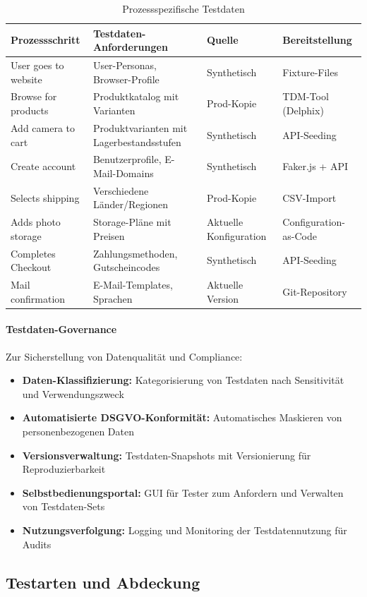 \begin{longtable}{|p{3cm}|p{5cm}|p{3cm}|p{3cm}|}
\caption{Prozessspezifische Testdaten} \\
\hline
\textbf{Prozessschritt} & \textbf{Testdaten-Anforderungen} & \textbf{Quelle} & \textbf{Bereitstellung}\\
\hline
User goes to website & User-Personas, Browser-Profile & Synthetisch & Fixture-Files\\
\hline
Browse for products & Produktkatalog mit Varianten & Prod-Kopie & TDM-Tool (Delphix)\\
\hline
Add camera to cart & Produktvarianten mit Lagerbestandsstufen & Synthetisch & API-Seeding\\
\hline
Create account & Benutzerprofile, E-Mail-Domains & Synthetisch & Faker.js + API\\
\hline
Selects shipping & Verschiedene Länder/Regionen & Prod-Kopie & CSV-Import\\
\hline
Adds photo storage & Storage-Pläne mit Preisen & Aktuelle Konfiguration & Configuration-as-Code\\
\hline
Completes Checkout & Zahlungsmethoden, Gutscheincodes & Synthetisch & API-Seeding\\
\hline
Mail confirmation & E-Mail-Templates, Sprachen & Aktuelle Version & Git-Repository\\
\hline
\end{longtable}

\paragraph{Testdaten-Governance}
Zur Sicherstellung von Datenqualität und Compliance:
\begin{itemize}
\item \textbf{Daten-Klassifizierung:} Kategorisierung von Testdaten nach Sensitivität und Verwendungszweck
\item \textbf{Automatisierte DSGVO-Konformität:} Automatisches Maskieren von personenbezogenen Daten
\item \textbf{Versionsverwaltung:} Testdaten-Snapshots mit Versionierung für Reproduzierbarkeit
\item \textbf{Selbstbedienungsportal:} GUI für Tester zum Anfordern und Verwalten von Testdaten-Sets
\item \textbf{Nutzungsverfolgung:} Logging und Monitoring der Testdatennutzung für Audits
\end{itemize}

\subsection{Testarten und Abdeckung}
